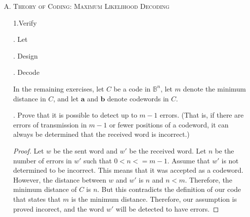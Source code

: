 \documentclass[twoside]{amsart}
\begin{document}
\begin{enumerate}[A.]
   \item \textsc{Theory of Coding: Maximum Likelihood Decoding}

      \noindent 1.Verify
      
      . Let
      
      . Design
      
      . Decode

      In the remaining exercises, let $C$ be a code in $\mathbb{B}^n$,
      let $m$ denote the minimum distance in $C$, and let 
      $\mathbf{a}$ and $\mathbf{b}$ denote codewords in $C$.

      . Prove that it is possible to detect up to $m-1$ errors.
      (That is, if there are errors of transmission in $m-1$ or 
      fewer positions of a codeword, it can always be determined
      that the received word is incorrect.)

      \begin{proof}
	 Let $w$ be the sent word and $w'$ be the received word. Let 
	 $n$ be the number of errors in $w'$ such that $0 < n <= m - 1$. 
	 Assume that $w'$ is not determined to be incorrect. This means
	 that it was accepted as a codeword. However, the distance
	 between $w$ and $w'$ is $n$ and $n < m$. Therefore, the 
	 minimum distance of $C$ is $n$. But this contradicts
	 the definition of our code that states that $m$ is the minimum
	 distance. Therefore, our assumption is proved incorect, and
	 the word $w'$ will be detected to have errors.
      \end{proof}

\end{enumerate}
\end{document}
